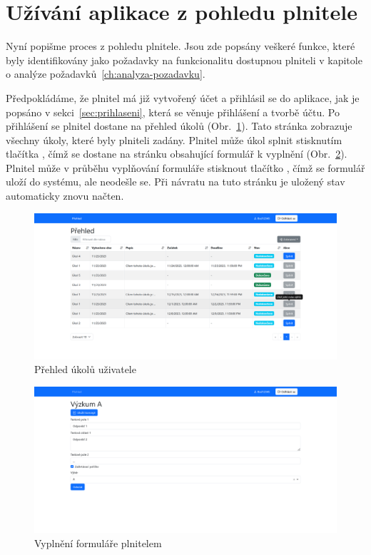 \section{Užívání aplikace z pohledu plnitele}\label{sec:uzivani-aplikace-z-pohledu-plnitele}

Nyní popišme proces z pohledu plnitele.
Jsou zde popsány veškeré funkce, které byly identifikovány jako požadavky na funkcionalitu dostupnou plniteli v kapitole o analýze požadavků~\ref{ch:analyza-pozadavku}.

Předpokládáme, že plnitel má již vytvořený účet a přihlásil se do aplikace, jak je popsáno v sekci~\ref{sec:prihlaseni}, která se věnuje přihlášení a tvorbě účtu.
Po přihlášení se plnitel dostane na přehled úkolů (Obr.~\ref{fig:prehled-ukolu-uzivatel-screenshot}).
Tato stránka zobrazuje všechny úkoly, které byly plniteli zadány.
Plnitel může úkol splnit stisknutím tlačítka , čímž se dostane na stránku obsahující formulář k vyplnění (Obr.~\ref{fig:vyplneni-formulare-uzivatel-screenshot}).
Plnitel může v průběhu vyplňování formuláře stisknout tlačítko , čímž se formulář uloží do systému, ale neodešle se.
Při návratu na tuto stránku je uložený stav automaticky znovu načten.

\begin{figure}[H]
    \centering
    \includegraphics[width=\textwidth]{../img/screenshots/prehled-uzivatel}
    \caption{Přehled úkolů uživatele}\label{fig:prehled-ukolu-uzivatel-screenshot}
\end{figure}

\begin{figure}[H]
    \centering
    \includegraphics[width=\textwidth]{../img/screenshots/vyplneni-formulare-uzivatel}
    \caption{Vyplnění formuláře plnitelem}\label{fig:vyplneni-formulare-uzivatel-screenshot}
\end{figure}

